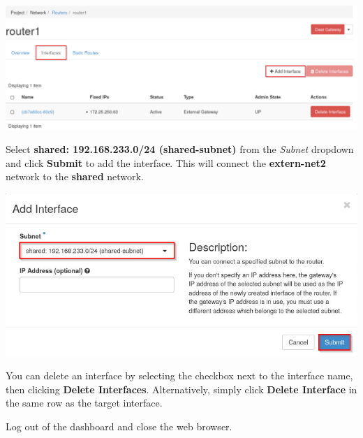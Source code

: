\documentclass[letterpaper, 12pt]{article}
\begin{document}
\begin{enumerate}
\begin{labstep}
        \begin{center}
            \includegraphics[width=\linewidth]{images/part2/step5.png}
        \end{center}
    \end{labstep}

    \begin{labstep}
        Select \textbf{shared: 192.168.233.0/24 (shared-subnet)} from the \textit{Subnet} dropdown and click \textbf{Submit} to add the interface.
        This will connect the \textbf{extern-net2} network to the \textbf{shared} network.

        \begin{center}
            \includegraphics[width=\linewidth]{images/part2/step6.png}
        \end{center}
    \end{labstep}

    \begin{tipbox}
        You can delete an interface by selecting the checkbox next to the interface name, then clicking \textbf{Delete Interfaces}.
        Alternatively, simply click \textbf{Delete Interface} in the same row as the target interface.
    \end{tipbox}

    \begin{labstep}
        Log out of the dashboard and close the web browser.
    \end{labstep}


\end{enumerate}
\end{document}
